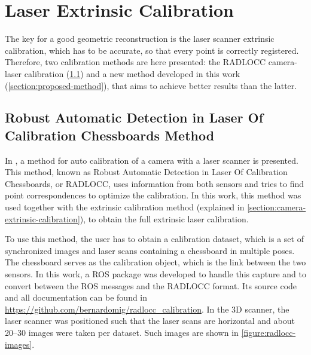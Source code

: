 \section{Laser Extrinsic Calibration}
\label{section:laser-extrinsic-calibration}

The key for a good geometric reconstruction is the laser scanner extrinsic calibration, which has to be accurate, so that every point is correctly registered. Therefore, two calibration methods are here presented: the RADLOCC camera-laser calibration (\cref{section:radlocc-method}) and a new method developed in this work (\cref{section:proposed-method}), that aims to achieve better results than the latter. 

\subsection{Robust Automatic Detection in Laser Of Calibration Chessboards Method}
\label{section:radlocc-method}

In \cite{zhang04}, a method for auto calibration of a camera with a laser scanner is presented. This method, known as Robust Automatic Detection in Laser Of Calibration Chessboards, or RADLOCC, uses information from both sensors and tries to find point correspondences to optimize the calibration. In this work, this method was used together with the extrinsic calibration method (explained in \cref{section:camera-extrinsic-calibration}), to obtain the full extrinsic laser calibration.

To use this method, the user has to obtain a calibration dataset, which is a set of synchronized images and laser scans containing a chessboard in multiple poses. The chessboard serves as the calibration object, which is the link between the two sensors. In this work, a ROS package was developed to handle this capture and to convert between the ROS messages and the RADLOCC format. Its source code and all documentation can be found in \url{https://github.com/bernardomig/radlocc_calibration}. In the 3D scanner, the laser scanner was positioned such that the laser scans are horizontal and about \numrange{20}{30} images were taken per dataset. Such images are shown in \cref{figure:radlocc-images}.



